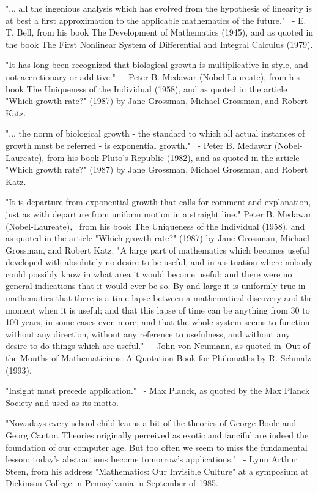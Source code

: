\documentclass[12pt]{article}
\begin{document}
"... all the ingenious analysis which has evolved from the hypothesis of linearity is at best a first approximation to the applicable mathematics of the future."
 - E. T. Bell, from his book The Development of Mathematics (1945), and as quoted in the book The First Nonlinear System of Differential and Integral Calculus (1979).

"It has long been recognized that biological growth is multiplicative in style, and not accretionary or additive."
 - Peter B. Medawar (Nobel-Laureate), from his book The Uniqueness of the Individual (1958), and as quoted in the article "Which growth rate?" (1987) by Jane Grossman, Michael Grossman, and Robert Katz. 

"... the norm of biological growth - the standard to which all actual instances of growth must be referred - is exponential growth."
 - Peter B. Medawar (Nobel-Laureate), from his book Pluto's Republic (1982), and as quoted in the article "Which growth rate?" (1987) by Jane Grossman, Michael Grossman, and Robert Katz. 

"It is departure from exponential growth that calls for comment and explanation, just as with departure from uniform motion in a straight line."
Peter B. Medawar (Nobel-Laureate),  from his book The Uniqueness of the Individual (1958), and as quoted in the article "Which growth rate?" (1987) by Jane Grossman, Michael Grossman, and Robert Katz.
"A large part of mathematics which becomes useful developed with absolutely no desire to be useful, and in a situation where nobody could possibly know in what area it would become useful; and there were no general indications that it would ever be so. By and large it is uniformly true in mathematics that there is a time lapse between a mathematical discovery and the moment when it is useful; and that this lapse of time can be anything from 30 to 100 years, in some cases even more; and that the whole system seems to function without any direction, without any reference to usefulness, and without any desire to do things which are useful."
 - John von Neumann, as quoted in Out of the Mouths of Mathematicians: A Quotation Book for Philomaths by R. Schmalz (1993).

"Insight must precede application."
 - Max Planck, as quoted by the Max Planck Society and used as its motto.

"Nowadays every school child learns a bit of the theories of George Boole and Georg Cantor. Theories originally perceived as exotic and fanciful are indeed the foundation of our computer age. But too often we seem to miss the fundamental lesson: today's abstractions become tomorrow's applications."
 - Lynn Arthur Steen, from his address "Mathematics: Our Invisible Culture" at a symposium at Dickinson College in Pennsylvania in September of 1985.
\end{document}
